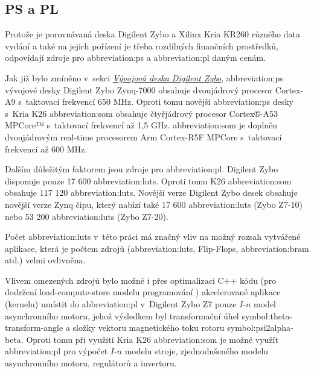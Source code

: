 \documentclass[a4paper, twoside, 11pt]{article}
\begin{document}
			\subsection{PS a PL}\label{subsec:ps-a-pl}
					Protože je porovnávaná deska Digilent Zybo a Xilinx Kria KR260 různého data vydání a také na jejich pořízení je třeba rozdílných finančních prostředků, odpovídají zdroje pro \gls{abbreviation:ps} a \gls{abbreviation:pl} daným cenám.\par
					Jak již bylo zmíněno v~sekci \hyperref[sec:vyvojova-deska-digilent-zybo]{\textit{Vývojová deska Digilent Zybo}}, \gls{abbreviation:ps} vývojové desky Digilent Zybo Zynq-7000 obsahuje dvoujádrový procesor Cortex-A9 s~taktovací frekvencí 650 MHz. Oproti tomu novější \gls{abbreviation:ps} desky s~Kria K26 \gls{abbreviation:som} obsahuje čtyřjádrový procesor Cortex®-A53 MPCore™ s~taktovací frekvencí až 1,5 GHz. \gls{abbreviation:som} je doplněn dvoujádrovým real-time procesorem Arm Cortex-R5F MPCore s~taktovací frekvencí až 600 MHz. \cite{digilent-zybo-reference-manual} \cite{kria-k26-som-ds}\par
					Dalším důležitým faktorem jsou zdroje pro \gls{abbreviation:pl}. Digilent Zybo disponuje pouze 17 600 \gls{abbreviation:luts}. Oproti tomu K26 \gls{abbreviation:som} obsahuje 117 120 \gls{abbreviation:luts}. Novější verze Digilent Zybo desek obsahuje novější verze Zynq čipu, který nabízí také 17 600 \gls{abbreviation:luts} (Zybo Z7-10) nebo 53 200 \gls{abbreviation:luts} (Zybo Z7-20). \cite{digilent-zybo-reference-manual} \cite{kria-k26-som-ds}\par
					Počet \gls{abbreviation:luts} v~této práci má značný vliv na možný rozsah vytvářené aplikace, která je počtem zdrojů (\gls{abbreviation:luts}, Flip-Flops, \gls{abbreviation:bram} atd.) velmi ovlivněna.\par
					Vlivem omezených zdrojů bylo možné i přes optimalizaci C++ kódu (pro dodržení load-compute-store modelu programování \cite{vitis-unified-software-platform-documentation-2022}) akcelerované aplikace (kernelu) umístit do \gls{abbreviation:pl} v~Digilent Zybo Z7 pouze $I$-$n$ model asynchronního motoru, jehož výsledkem byl transformační úhel \gls{symbol:theta-transform-angle} a složky vektoru magnetického toku rotoru \gls{symbol:psi2alpha-beta}. Oproti tomu při využití Kria K26 \gls{abbreviation:som} je možné využít \gls{abbreviation:pl} pro výpočet $I$-$n$ modelu stroje, zjednodušeného modelu asynchronního motoru, regulátorů a invertoru.
\end{document}
